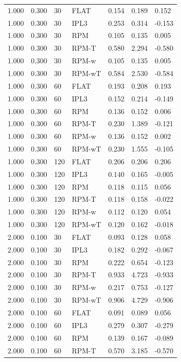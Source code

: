 \begin{tabular}{lllllll}
1.000 & 0.300 & 30 & FLAT & 0.154 & 0.189 & 0.152 \\
1.000 & 0.300 & 30 & IPL3 & 0.253 & 0.314 & -0.153 \\
1.000 & 0.300 & 30 & RPM & 0.105 & 0.135 & 0.005 \\
1.000 & 0.300 & 30 & RPM-T & 0.580 & 2.294 & -0.580 \\
1.000 & 0.300 & 30 & RPM-w & 0.105 & 0.135 & 0.005 \\
1.000 & 0.300 & 30 & RPM-wT & 0.584 & 2.530 & -0.584 \\
1.000 & 0.300 & 60 & FLAT & 0.193 & 0.208 & 0.193 \\
1.000 & 0.300 & 60 & IPL3 & 0.152 & 0.214 & -0.149 \\
1.000 & 0.300 & 60 & RPM & 0.136 & 0.152 & 0.006 \\
1.000 & 0.300 & 60 & RPM-T & 0.230 & 1.389 & -0.121 \\
1.000 & 0.300 & 60 & RPM-w & 0.136 & 0.152 & 0.002 \\
1.000 & 0.300 & 60 & RPM-wT & 0.230 & 1.555 & -0.105 \\
1.000 & 0.300 & 120 & FLAT & 0.206 & 0.206 & 0.206 \\
1.000 & 0.300 & 120 & IPL3 & 0.140 & 0.165 & -0.005 \\
1.000 & 0.300 & 120 & RPM & 0.118 & 0.115 & 0.056 \\
1.000 & 0.300 & 120 & RPM-T & 0.118 & 0.158 & -0.022 \\
1.000 & 0.300 & 120 & RPM-w & 0.112 & 0.120 & 0.054 \\
1.000 & 0.300 & 120 & RPM-wT & 0.120 & 0.162 & -0.018 \\
2.000 & 0.100 & 30 & FLAT & 0.093 & 0.128 & 0.058 \\
2.000 & 0.100 & 30 & IPL3 & 0.182 & 0.292 & -0.067 \\
2.000 & 0.100 & 30 & RPM & 0.222 & 0.654 & -0.123 \\
2.000 & 0.100 & 30 & RPM-T & 0.933 & 4.723 & -0.933 \\
2.000 & 0.100 & 30 & RPM-w & 0.217 & 0.753 & -0.127 \\
2.000 & 0.100 & 30 & RPM-wT & 0.906 & 4.729 & -0.906 \\
2.000 & 0.100 & 60 & FLAT & 0.091 & 0.089 & 0.056 \\
2.000 & 0.100 & 60 & IPL3 & 0.279 & 0.307 & -0.279 \\
2.000 & 0.100 & 60 & RPM & 0.139 & 0.167 & -0.089 \\
2.000 & 0.100 & 60 & RPM-T & 0.570 & 3.185 & -0.570 \\

\end{tabular}
